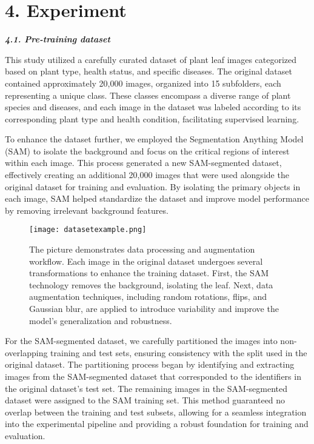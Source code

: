 \documentclass{article}
\begin{document}
\section*{4. Experiment}
\textbf{\textit{4.1. Pre-training dataset}}

This study utilized a carefully curated dataset of plant leaf images categorized based on plant type, health status, and specific diseases. The original dataset contained approximately 20,000 images, organized into 15 subfolders, each representing a unique class. These classes encompass a diverse range of plant species and diseases, and each image in the dataset was labeled according to its corresponding plant type and health condition, facilitating supervised learning.

To enhance the dataset further, we employed the Segmentation Anything Model (SAM) to isolate the background and focus on the critical regions of interest within each image. This process generated a new SAM-segmented dataset, effectively creating an additional 20,000 images that were used alongside the original dataset for training and evaluation. By isolating the primary objects in each image, SAM helped standardize the dataset and improve model performance by removing irrelevant background features.


\begin{figure}[H]
\centering
\texttt{[image: datasetexample.png]}
\captionsetup{font=small}
\caption{The picture demonstrates data processing and augmentation workflow. Each image in the original dataset undergoes several transformations to enhance the training dataset. First, the SAM technology removes the background, isolating the leaf. Next, data augmentation techniques, including random rotations, flips, and Gaussian blur, are applied to introduce variability and improve the model's generalization and robustness.}
\label{fig:vit}
\end{figure}



For the SAM-segmented dataset, we carefully partitioned the images into non-overlapping training and test sets, ensuring consistency with the split used in the original dataset. The partitioning process began by identifying and extracting images from the SAM-segmented dataset that corresponded to the identifiers in the original dataset's test set. The remaining images in the SAM-segmented dataset were assigned to the SAM training set. This method guaranteed no overlap between the training and test subsets, allowing for a seamless integration into the experimental pipeline and providing a robust foundation for training and evaluation.
\end{document}
